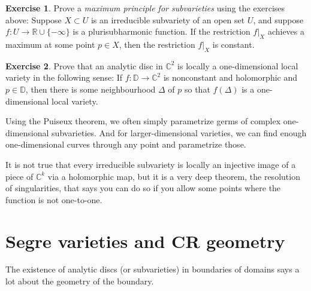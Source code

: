 \documentclass[12pt,openany]{book}
\newcommand{\C}{{\mathbb{C}}}
\newcommand{\R}{{\mathbb{R}}}
\newcommand{\D}{{\mathbb{D}}}
\theoremstyle{plain}
\theoremstyle{remark}
\theoremstyle{definition}
\newenvironment{exbox}{%
    \def\FrameCommand{\vrule width 1pt \relax\hspace{10pt}}%
    \MakeFramed{\advance\hsize-\width\FrameRestore}%
}{%
    \endMakeFramed
}
\theoremstyle{exercise}
\newtheorem{exercise}{Exercise}[section]
\theoremstyle{example}
\begin{document}
\begin{exbox}
\begin{exercise}\label{exercise:maxprincsubvar}
Prove a \emph{maximum principle for subvarieties} using the exercises above:
Suppose $X \subset U$ is an irreducible subvariety of an open set $U$,
and suppose $f \colon U \to \R \cup \{ - \infty \}$
is a plurisubharmonic function.  If the restriction $f|_X$
achieves a maximum
at some point $p \in X$, then the restriction $f|_X$ is constant.
\end{exercise}

\begin{exercise}
Prove that an analytic disc in $\C^2$ is locally a one-dimensional local
variety in the following sense:  If $f \colon \D \to \C^2$ is nonconstant
and holomorphic and $p \in \D$, then there is some neighbourhood $\Delta$
of $p$ so that $f(\Delta)$ is a one-dimensional local variety.
\end{exercise}
\end{exbox}

Using the Puiseux theorem, we often simply parametrize germs
of complex one-dimensional subvarieties.
And for larger-dimensional varieties, we can find
enough one-dimensional curves through any point and parametrize those.

It is not true that every irreducible subvariety is locally
an injective image of a piece of
$\C^k$ via a holomorphic map, but it is a very deep theorem,
the resolution of singularities, that says you can do so if you allow some points
where the function is not one-to-one.


\section{Segre varieties and CR geometry} \label{sec:crgeomcr}

The existence of analytic discs (or subvarieties)
in boundaries of domains says a lot about the geometry of the boundary.
\end{document}
